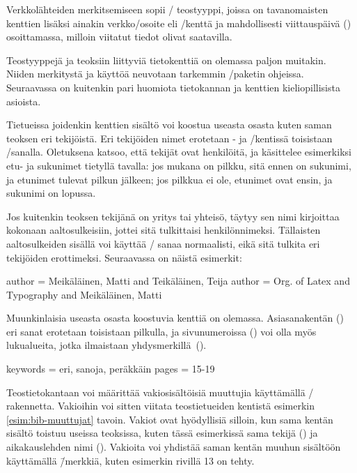 Verkkolähteiden merkitsemiseen sopii \-/ teostyyppi,
joissa on tavanomaisten kenttien lisäksi ainakin verkko\-/osoite eli
\-/kenttä ja mahdollisesti viittauspäivä ()
osoittamassa, milloin viitatut tiedot olivat saatavilla.

Teostyyppejä ja teoksiin liittyviä tietokenttiä on olemassa paljon
muitakin. Niiden merkitystä ja käyttöä neuvotaan tarkemmin
\-/paketin ohjeissa. Seuraavassa on kuitenkin pari
huomiota tietokannan ja kenttien kieliopillisista asioista.

Tietueissa joidenkin kenttien sisältö voi koostua useasta osasta kuten
saman teoksen eri tekijöistä. Eri tekijöiden nimet erotetaan
- ja \-/kentissä toisistaan
\-/sanalla. Oletuksena  katsoo, että
tekijät ovat henkilöitä, ja käsittelee esimerkiksi etu- ja sukunimet
tietyllä tavalla: jos mukana on pilkku, sitä ennen on sukunimi, ja
etunimet tulevat pilkun jälkeen; jos pilkkua ei ole, etunimet ovat
ensin, ja sukunimi on lopussa.

Jos kuitenkin teoksen tekijänä on yritys tai yhteisö, täytyy sen nimi
kirjoittaa kokonaan aaltosulkeisiin, jottei sitä tulkittaisi
henkilönnimeksi. Tällaisten aaltosulkeiden sisällä voi käyttää
\-/ sanaa normaalisti, eikä sitä tulkita eri tekijöiden
erottimeksi. Seuraavassa on näistä esimerkit:

\begin{koodilohkosis}
author = {Meikäläinen, Matti and Teikäläinen, Teija}
author = {{Org. of Latex and Typography} and Meikäläinen, Matti}
\end{koodilohkosis}

Muunkinlaisia useasta osasta koostuvia kenttiä on olemassa.
Asiasanakentän () eri sanat erotetaan toisistaan
pilkulla, ja sivunumeroissa () voi olla myös lukualueita,
jotka ilmaistaan yhdysmerkillä~\mbox{(\koodi{-})}.

\begin{koodilohkosis}
keywords = {eri, sanoja, peräkkäin}
pages = {15-19}
\end{koodilohkosis}

Teostietokantaan voi määrittää vakiosisältöisiä muuttujia käyttämällä
\-/ rakennetta. Vakioihin voi sitten viitata
teostietueiden kentistä esimerkin \ref{esim:bib-muuttujat} tavoin.
Vakiot ovat hyödyllisiä silloin, kun sama kentän sisältö toistuu useissa
teoksissa, kuten tässä esimerkissä sama tekijä () ja
aikakauslehden nimi (). Vakioita voi yhdistää
saman kentän muuhun sisältöön käyttämällä \koodi{\#}\=/merkkiä, kuten
esimerkin rivillä 13 on tehty.

